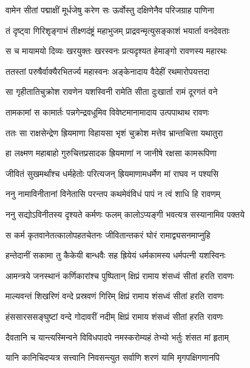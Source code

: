 \twolineshloka
{वामेन सीतां पद्माक्षीं मूर्धजेषु करेण सः}
{ऊर्वोस्तु दक्षिणेनैव परिजग्राह पाणिना} %

\twolineshloka
{तं दृष्ट्वा गिरिशृङ्गाभं तीक्ष्णदंष्ट्रं महाभुजम्}
{प्राद्रवन्मृत्युसङ्काशं भयार्ता वनदेवताः} %

\twolineshloka
{स च मायामयो दिव्यः खरयुक्तः खरस्वनः}
{प्रत्यदृश्यत हेमाङ्गो रावणस्य महारथः} %

\twolineshloka
{ततस्तां परुषैर्वाक्यैरभितर्ज्य महास्वनः}
{अङ्केनादाय वैदेहीं रथमारोपयत्तदा} %

\twolineshloka
{सा गृहीतातिचुक्रोश रावणेन यशस्विनी}
{रामेति सीता दुःखार्ता रामं दूरगतं वने} %

\twolineshloka
{तामकामां स कामार्तः पन्नगेन्द्रवधूमिव}
{विवेष्टमानामादाय उत्पपाथाथ रावणः} %

\twolineshloka
{ततः सा राक्षसेन्द्रेण ह्रियमाणा विहायसा}
{भृशं चुक्रोश मत्तेव भ्रान्तचित्ता यथातुरा} %

\twolineshloka
{हा लक्ष्मण महाबाहो गुरुचित्तप्रसादक}
{ह्रियमाणां न जानीषे रक्षसा कामरूपिणा} %

\twolineshloka
{जीवितं सुखमर्थांश्च धर्महेतोः परित्यजन्}
{ह्रियमाणामधर्मेण मां राघव न पश्यसि} %

\twolineshloka
{ननु नामाविनीतानां विनेतासि परन्तप}
{कथमेवंविधं पापं न त्वं शाधि हि रावणम्} %

\twolineshloka
{ननु सद्योऽविनीतस्य दृश्यते कर्मणः फलम्}
{कालोऽप्यङ्गी भवत्यत्र सस्यानामिव पक्तये} %

\twolineshloka
{स कर्म कृतवानेतत्कालोपहतचेतनः}
{जीवितान्तकरं घोरं रामाद्व्यसनमाप्नुहि} %

\twolineshloka
{हन्तेदानीं सकामा तु कैकेयी बान्धवैः सह}
{ह्रियेयं धर्मकामस्य धर्मपत्नी यशस्विनः} %

\twolineshloka
{आमन्त्रये जनस्थानं कर्णिकारांश्च पुष्पितान्}
{क्षिप्रं रामाय शंसध्वं सीतां हरति रावणः} %

\twolineshloka
{माल्यवन्तं शिखरिणं वन्दे प्रस्रवणं गिरिम्}
{क्षिप्रं रामाय शंसध्वं सीतां हरति रावणः} %

\twolineshloka
{हंससारससङ्घुष्टां वन्दे गोदावरीं नदीम्}
{क्षिप्रं रामाय शंसध्वं सीतां हरति रावणः} %

\twolineshloka
{दैवतानि च यान्त्यस्मिन्वने विविधपादपे}
{नमस्करोम्यहं तेभ्यो भर्तुः शंसत मां हृताम्} %

\twolineshloka
{यानि कानिचिदप्यत्र सत्त्वानि निवसन्त्युत}
{सर्वाणि शरणं यामि मृगपक्षिगणानपि} %

